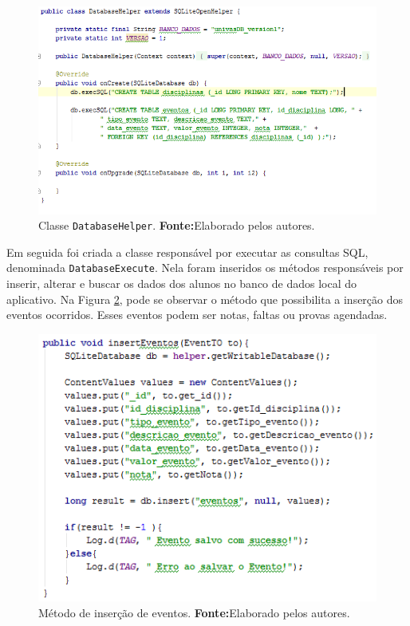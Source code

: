 	\begin{figure}[h!] 
		\centerline{\includegraphics[scale=0.7]{./imagens/2_q_metodologico/4_procedimentos_resultados/42_aplicativo/app2.png}}
		\caption[Classe DatabaseHelper]{Classe \texttt{DatabaseHelper}.
		\textbf{Fonte:}Elaborado pelos autores.}
		\label{fig:app2}
	\end{figure}
	
	\pagebreak
	
	\par Em seguida foi criada a classe responsável por executar as consultas SQL,
denominada \texttt{DatabaseExecute}. Nela foram inseridos os métodos
responsáveis por inserir, alterar e buscar os dados dos alunos no banco de
dados local do aplicativo. Na Figura \ref{fig:app3}, pode se observar o método
que possibilita a inserção dos eventos ocorridos. Esses eventos podem ser notas,
faltas ou provas agendadas.

	\begin{figure}[h!] 
		\centerline{\includegraphics[scale=1]{./imagens/2_q_metodologico/4_procedimentos_resultados/42_aplicativo/app3.png}}
		\caption[Método de inserção de eventos]{Método de inserção de eventos.
		\textbf{Fonte:}Elaborado pelos autores.}
		\label{fig:app3}
	\end{figure}
	
